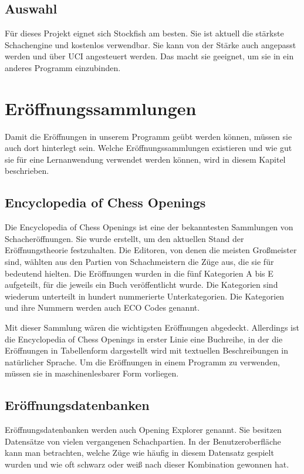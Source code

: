 \subsection{Auswahl}
Für dieses Projekt eignet sich Stockfish am besten. Sie ist aktuell die stärkste Schachengine und kostenlos verwendbar. Sie kann von der Stärke auch angepasst werden und über \ac{UCI} angesteuert werden. Das macht sie geeignet, um sie in ein anderes Programm einzubinden.

\section{Eröffnungssammlungen}
Damit die Eröffnungen in unserem Programm geübt werden können, müssen sie auch dort hinterlegt sein. Welche Eröffnungssammlungen existieren und wie gut sie für eine Lernanwendung verwendet werden können, wird in diesem Kapitel beschrieben.

\subsection{Encyclopedia of Chess Openings}
Die Encyclopedia of Chess Openings ist eine der bekanntesten Sammlungen von Schacheröffnungen. Sie wurde erstellt, um den aktuellen Stand der Eröffnungstheorie festzuhalten.
Die Editoren, von denen die meisten Großmeister sind, wählten aus den Partien von Schachmeistern die Züge aus, die sie für bedeutend hielten. Die Eröffnungen wurden in die fünf Kategorien A bis E aufgeteilt, für die jeweils ein Buch veröffentlicht wurde. Die Kategorien sind wiederum unterteilt in hundert nummerierte Unterkategorien. Die Kategorien und ihre Nummern werden auch ECO Codes genannt.
\cite{wikipedia_foundation_inc_encyclopaedia_2024}

Mit dieser Sammlung wären die wichtigsten Eröffnungen abgedeckt. Allerdings ist die Encyclopedia of Chess Openings in erster Linie eine Buchreihe, in der die Eröffnungen in Tabellenform dargestellt wird mit textuellen Beschreibungen in natürlicher Sprache. Um die Eröffnungen in einem Programm zu verwenden, müssen sie in maschinenlesbarer Form vorliegen.

\subsection{Eröffnungsdatenbanken}
Eröffnungsdatenbanken werden auch Opening Explorer genannt. Sie besitzen Datensätze von vielen vergangenen Schachpartien. In der Benutzeroberfläche kann man betrachten, welche Züge wie häufig in diesem Datensatz gespielt wurden und wie oft schwarz oder weiß nach dieser Kombination gewonnen hat. 

